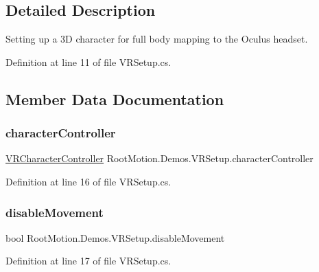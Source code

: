 \subsection{Detailed Description}
Setting up a 3D character for full body mapping to the Oculus headset. 



Definition at line 11 of file V\+R\+Setup.\+cs.



\subsection{Member Data Documentation}
\mbox{\label{class_root_motion_1_1_demos_1_1_v_r_setup_ab301d9835352884dbaabd1a8149fceca}} 
\subsubsection{\texorpdfstring{character\+Controller}{characterController}}
{\footnotesize\ttfamily \mbox{\hyperlink{class_root_motion_1_1_demos_1_1_v_r_character_controller}{V\+R\+Character\+Controller}} Root\+Motion.\+Demos.\+V\+R\+Setup.\+character\+Controller}



Definition at line 16 of file V\+R\+Setup.\+cs.

\mbox{\label{class_root_motion_1_1_demos_1_1_v_r_setup_a6403a2a49f15607d93e09280e51c30ec}} 
\subsubsection{\texorpdfstring{disable\+Movement}{disableMovement}}
{\footnotesize\ttfamily bool Root\+Motion.\+Demos.\+V\+R\+Setup.\+disable\+Movement}



Definition at line 17 of file V\+R\+Setup.\+cs.

